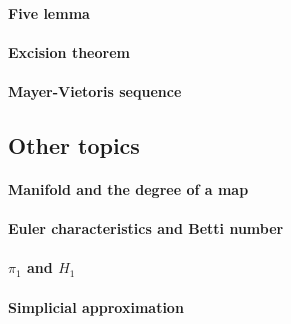 \documentclass[11pt]{article}
\theoremstyle{definition}
\theoremstyle{plain}
\begin{document}
\paragraph{Five lemma}

\paragraph{Excision theorem}

\paragraph{Mayer-Vietoris sequence}

\subsection{Other topics}

\paragraph{Manifold and the degree of a map}

\paragraph{Euler characteristics and Betti number}

\paragraph{$\pi_1$ and $H_1$}

\paragraph{Simplicial approximation}
\end{document}
